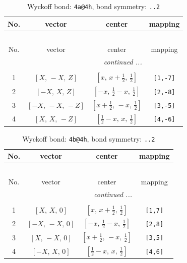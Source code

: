 \documentclass[fleqn,8pt]{jsarticle}
\begin{document}
\begin{longtable}{cccc}
\caption{Wyckoff bond: {\tt 4a@4h}, bond symmetry: {\tt ..2}}
 \\
 \hline \hline
No. & vector & center & mapping \\ \hline \endfirsthead

\multicolumn{3}{l}{\tablename\ \thetable{}} \\
 \hline \hline
No. & vector & center & mapping \\ \hline \endhead

 \hline \hline
\multicolumn{3}{r}{\footnotesize\it continued ...} \\ \endfoot

 \hline \hline
\multicolumn{3}{r}{} \\ \endlastfoot

1 & $\left[ X,\, - X,\, Z \right]$ & $\left[ x,\, x + \frac{1}{2},\, \frac{1}{2} \right]$ & {\tt [1,-7]} \\ \hline
2 & $\left[ - X,\, X,\, Z \right]$ & $\left[ - x,\, \frac{1}{2} - x,\, \frac{1}{2} \right]$ & {\tt [2,-8]} \\ \hline
3 & $\left[ - X,\, - X,\, - Z \right]$ & $\left[ x + \frac{1}{2},\, - x,\, \frac{1}{2} \right]$ & {\tt [3,-5]} \\ \hline
4 & $\left[ X,\, X,\, - Z \right]$ & $\left[ \frac{1}{2} - x,\, x,\, \frac{1}{2} \right]$ & {\tt [4,-6]} \\
\end{longtable}
\renewcommand{\arraystretch}{1.2}
\begin{longtable}{cccc}
\caption{Wyckoff bond: {\tt 4b@4h}, bond symmetry: {\tt ..2}}
 \\
 \hline \hline
No. & vector & center & mapping \\ \hline \endfirsthead

\multicolumn{3}{l}{\tablename\ \thetable{}} \\
 \hline \hline
No. & vector & center & mapping \\ \hline \endhead

 \hline \hline
\multicolumn{3}{r}{\footnotesize\it continued ...} \\ \endfoot

 \hline \hline
\multicolumn{3}{r}{} \\ \endlastfoot

1 & $\left[ X,\, X,\, 0 \right]$ & $\left[ x,\, x + \frac{1}{2},\, \frac{1}{2} \right]$ & {\tt [1,7]} \\ \hline
2 & $\left[ - X,\, - X,\, 0 \right]$ & $\left[ - x,\, \frac{1}{2} - x,\, \frac{1}{2} \right]$ & {\tt [2,8]} \\ \hline
3 & $\left[ X,\, - X,\, 0 \right]$ & $\left[ x + \frac{1}{2},\, - x,\, \frac{1}{2} \right]$ & {\tt [3,5]} \\ \hline
4 & $\left[ - X,\, X,\, 0 \right]$ & $\left[ \frac{1}{2} - x,\, x,\, \frac{1}{2} \right]$ & {\tt [4,6]} \\
\end{longtable}
\end{document}
